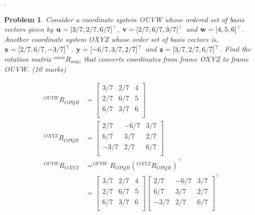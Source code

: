 \documentclass{article}
\newtheorem{prob}{Problem}
\begin{document}
\newpage
.
\newpage

\begin{prob}
  Consider a coordinate system OUVW whose ordered set of basis vectors given by
  $\mathbf{u} = [3/7, 2/7, 6/7]^\top$, $\mathbf{v} = [2/7, 6/7, 3/7]^\top$ and $\mathbf{w} = [4,
  5, 6]^\top$.
  Another coordinate system OXYZ whose order set of basis vectors is, $\mathbf{x} =
  [2/7, 6/7, -3/7]^\top$, $\mathbf{y} = [-6/7, 3/7, 2/7]^\top$ and $\mathbf{z} = [3/7, 2/7, 6/7]^\top$.
  Find the rotation matrix $^{ouvw}R_{oxyz}$ that converts coordinates from frame OXYZ to frame OUVW. (10 marks)
\end{prob}
\begin{align}
  ^{OUVW}R_{OPQR} &= \begin{bmatrix}
    3/7 & 2/7 & 4 \\
    2/7 & 6/7 & 5  \\
    6/7 & 3/7 & 6 \\
  \end{bmatrix} \\
  ^{OXYZ}R_{OPQR} &= \begin{bmatrix}
    2/7 & -6/7 & 3/7 \\
    6/7 & 3/7 & 2/7  \\
    -3/7 & 2/7 & 6/7 \\
  \end{bmatrix} \\
  ^{OUVW}R_{OXYZ} &= ^{OUVW}R_{OPQR} (^{OXYZ}R_{OPQR})^\top \\
&= \begin{bmatrix}
    3/7 & 2/7 & 4 \\
    2/7 & 6/7 & 5  \\
    6/7 & 3/7 & 6 \\
  \end{bmatrix}
\begin{bmatrix}
    2/7 & -6/7 & 3/7 \\
    6/7 & 3/7 & 2/7  \\
    -3/7 & 2/7 & 6/7 \\
  \end{bmatrix}^\top
\end{align}
\newpage
\end{document}
